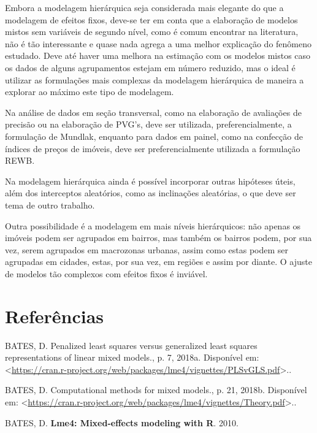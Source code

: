 \documentclass[
  a4paper, 11pt]{article}
\begin{document}
Embora a modelagem hierárquica seja considerada mais elegante do que a
modelagem de efeitos fixos, deve-se ter em conta que a elaboração de
modelos mistos sem variáveis de segundo nível, como é comum encontrar na
literatura, não é tão interessante e quase nada agrega a uma melhor
explicação do fenômeno estudado. Deve até haver uma melhora na estimação
com os modelos mistos caso os dados de alguns agrupamentos estejam em
número reduzido, mas o ideal é utilizar as formulações mais complexas da
modelagem hierárquica de maneira a explorar ao máximo este tipo de
modelagem.

Na análise de dados em seção transversal, como na elaboração de
avaliações de precisão ou na elaboração de PVG's, deve ser utilizada,
preferencialmente, a formulação de Mundlak, enquanto para dados em
painel, como na confecção de índices de preços de imóveis, deve ser
preferencialmente utilizada a formulação REWB.

Na modelagem hierárquica ainda é possível incorporar outras hipóteses
úteis, além dos interceptos aleatórios, como as inclinações aleatórias,
o que deve ser tema de outro trabalho.

Outra possibilidade é a modelagem em mais níveis hierárquicos: não
apenas os imóveis podem ser agrupados em bairros, mas também os bairros
podem, por sua vez, serem agrupados em macrozonas urbanas, assim como
estas podem ser agrupadas em cidades, estas, por sua vez, em regiões e
assim por diante. O ajuste de modelos tão complexos com efeitos fixos é
inviável.

\hypertarget{referuxeancias}{%
\section*{Referências}\label{referuxeancias}}

\hypertarget{refs}{}
\leavevmode\hypertarget{ref-Bates3}{}%
BATES, D. Penalized least squares versus generalized least squares
representations of linear mixed models., p. 7, 2018a. Disponível em:
\textless{}\url{https://cran.r-project.org/web/packages/lme4/vignettes/PLSvGLS.pdf}\textgreater..

\leavevmode\hypertarget{ref-Bates2}{}%
BATES, D. Computational methods for mixed models., p. 21, 2018b.
Disponível em:
\textless{}\url{https://cran.r-project.org/web/packages/lme4/vignettes/Theory.pdf}\textgreater..

\leavevmode\hypertarget{ref-Batesbook}{}%
BATES, D. \textbf{Lme4: Mixed-effects modeling with R}. 2010.
\end{document}
